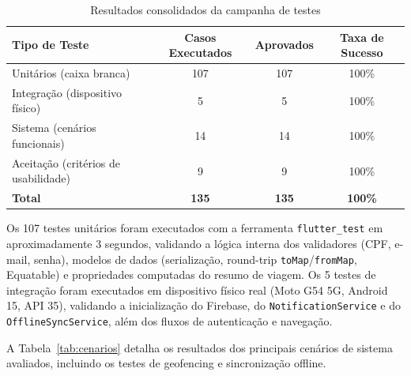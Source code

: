 \documentclass[12pt]{article}
\begin{document}
\begin{table}[H]
\caption{Resultados consolidados da campanha de testes}
\label{tab:testes}
\centering
\renewcommand{\arraystretch}{1.25}
\begin{tabular}{lccc}
\toprule
\textbf{Tipo de Teste} & \textbf{Casos Executados} & \textbf{Aprovados} & \textbf{Taxa de Sucesso} \\
\midrule
Unitários (caixa branca)                    & 107 & 107 & 100\% \\
Integração (dispositivo físico)             &   5 &   5 & 100\% \\
Sistema (cenários funcionais)               &  14 &  14 & 100\% \\
Aceitação (critérios de usabilidade)        &   9 &   9 & 100\% \\
\midrule
\textbf{Total}                              & \textbf{135} & \textbf{135} & \textbf{100\%} \\
\bottomrule
\end{tabular}
\end{table}

Os 107 testes unitários foram executados com a ferramenta \texttt{flutter\_test} em aproximadamente 3 segundos, validando a lógica interna dos validadores (CPF, e-mail, senha), modelos de dados (serialização, round-trip \texttt{toMap}/\texttt{fromMap}, Equatable) e propriedades computadas do resumo de viagem. Os 5 testes de integração foram executados em dispositivo físico real (Moto G54 5G, Android 15, API 35), validando a inicialização do Firebase, do \texttt{NotificationService} e do \texttt{OfflineSyncService}, além dos fluxos de autenticação e navegação.

A Tabela~\ref{tab:cenarios} detalha os resultados dos principais cenários de sistema avaliados, incluindo os testes de geofencing e sincronização offline.
\end{document}
